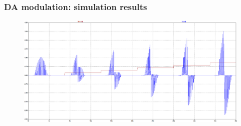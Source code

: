 \documentclass[12pt, aspectratio=169]{beamer}
\begin{document}

\begin{frame}
\frametitle{DA modulation: simulation results}
\begin{figure}
\includegraphics[width=0.8\linewidth]{resultD2v3.png}
\end{figure}
\end{frame}



\end{document}
